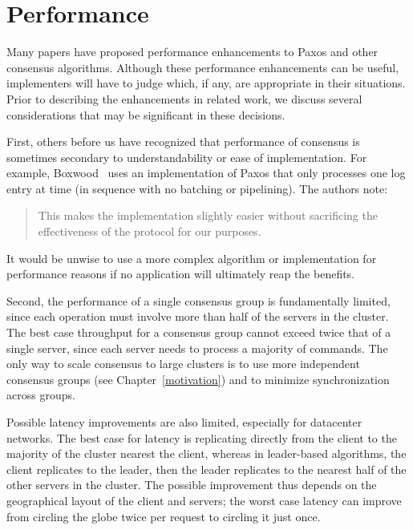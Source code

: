 \section{Performance}
\label{related:performance}


Many papers have proposed performance enhancements to Paxos and other
consensus algorithms. Although these performance enhancements can be
useful, implementers will have to judge which, if any, are
appropriate in their situations. Prior to describing the enhancements in
related work, we discuss several considerations that may be significant
in these decisions.

First, others before us have recognized that performance of consensus is
sometimes secondary to understandability or ease of implementation. For
example, Boxwood~\cite{MacCormick:2004} uses an implementation of Paxos
that only processes one log entry at time (in sequence with no batching
or pipelining). The authors note:
%
\begin{quote}
%
This makes the implementation slightly easier without sacrificing the
effectiveness of the protocol for our purposes.
%
\end{quote}
%
It would be unwise to use a more complex algorithm or implementation for
performance reasons if no application will ultimately reap the benefits.

Second, the performance of a single consensus group is fundamentally
limited, since each operation must involve more than half of the servers
in the cluster. The best case throughput for a consensus group cannot
exceed twice that of a single server, since each server needs to process
a majority of commands. The only way to scale consensus to large
clusters is to use more independent consensus groups (see
Chapter~\ref{motivation}) and to minimize synchronization across
groups.

Possible latency improvements are also limited, especially for
datacenter networks. The best case for latency is replicating directly
from the client to the majority of the cluster nearest the client,
whereas in leader-based algorithms, the client replicates to the leader,
then the leader replicates to the nearest half of the other servers in
the cluster. The possible improvement thus depends on the geographical
layout of the client and servers; the worst case latency can improve
from circling the globe twice per request to circling it just once.

